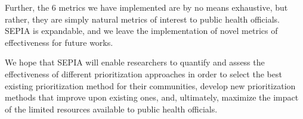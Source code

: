 \documentclass[twocolumn]{bmcart}%
\begin{document}
Further, the 6 metrics we have implemented are by no means exhaustive, but rather, they are simply natural metrics of interest to public health officials. SEPIA is expandable, and we leave the implementation of novel metrics of effectiveness for future works.

We hope that SEPIA will enable researchers to quantify and assess the effectiveness of different prioritization approaches in order to select the best existing prioritization method for their communities, develop new prioritization methods that improve upon existing ones, and, ultimately, maximize the impact of the limited resources available to public health officials.

\end{document}
